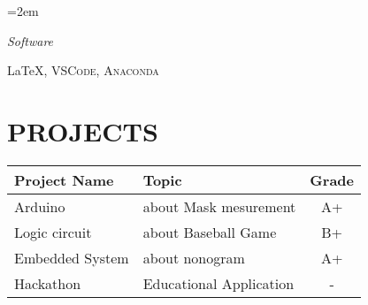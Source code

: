\documentclass[paper=a4,fontsize=11pt]{scrartcl} %
\newlength{\spacebox}
\newcommand{\NewPart}[1]{\section*{\uppercase{#1}}}
\newcommand{\PersonalEntry}[2]{
        \noindent\hangindent=2em\hangafter=0 %
        \parbox{\spacebox}{        %
        \textit{#1}}               %
        \hspace{1.5em} #2 \par}    %
\newcommand{\SkillsEntry}[2]{      %
        \noindent\hangindent=2em\hangafter=0 %
        \parbox{10.5em}{        %
        \textit{#1}}               %
        \hspace{1em} #2 \par}    %
\begin{document}
\SkillsEntry{Software}{\LaTeX, \textsc{VSCode}, \textsc{Anaconda}}

\NewPart{Projects}{}

\begin{table}[!h]
	\centering
	\resizebox{12cm}{!}
	{%

	\begin{tabular}{|l|l|c|}
		\hline
		{Project Name}&{Topic}&{Grade}\\
		\hline
		\hline
		
		Arduino  	& about Mask mesurement         & A+\\
		\hline
		Logic circuit     & about Baseball Game & B+\\
		\hline
		Embedded System    & about nonogram & A+\\
		\hline
		Hackathon     & Educational Application & -\\ 
		\hline
	\end{tabular}
	}

\end{table}


\end{document}
